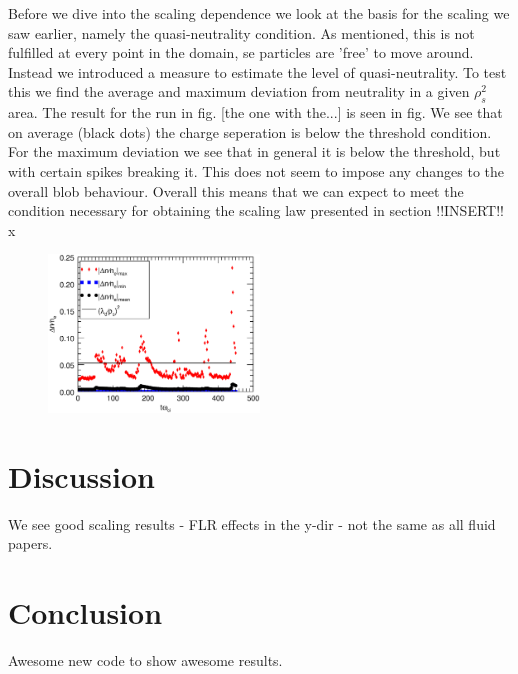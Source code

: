 \documentclass[9pt,twocolumn]{article}
\renewcommand{\=}[1]{\stackrel{#1}{=}} %
\theoremstyle{definition}
\theoremstyle{remark}
\begin{document}
Before we dive into the scaling dependence we look at the basis for the scaling we saw earlier, namely the quasi-neutrality condition. As mentioned, this is not fulfilled at every point in the domain, se particles are 'free' to move around. Instead we introduced a measure to estimate the level of quasi-neutrality. To test this we find the average and maximum deviation from neutrality in a given $\rho_s^2$ area. The result for the run in fig. [the one with the...] is seen in fig. We see that on average (black dots) the charge seperation is below the threshold condition. For the maximum deviation we see that in general it is below the threshold, but with certain spikes breaking it. This does not seem to impose any changes to the overall blob behaviour. Overall this means that we can expect to meet the condition necessary for obtaining the scaling law presented in section !!INSERT!!
x

\begin{figure}[h]
\center
	\includegraphics[width=0.5\textwidth]{Pictures/quasineuwl.eps}
\end{figure}





\section{Discussion}
We see good scaling results - FLR effects in the y-dir - not the same as all fluid papers.

\section{Conclusion}
Awesome new code to show awesome results.


\end{document}
